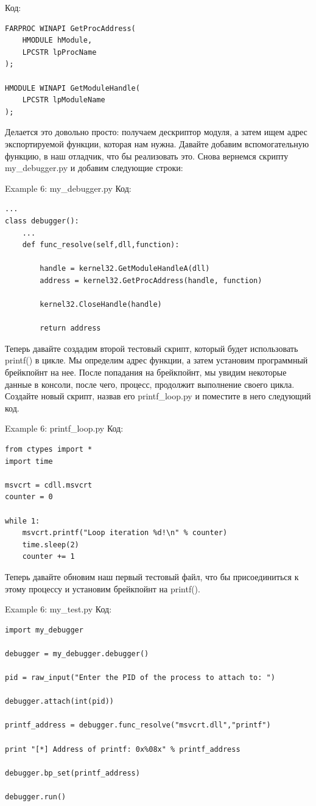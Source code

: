 \documentclass[12pt]{book}
\begin{document}
Код:
\begin{lstlisting}
FARPROC WINAPI GetProcAddress(
    HMODULE hModule,
    LPCSTR lpProcName
);

HMODULE WINAPI GetModuleHandle(
    LPCSTR lpModuleName
);
\end{lstlisting}

Делается это довольно просто: получаем дескриптор модуля, а затем ищем адрес экспортируемой функции, которая нам нужна. Давайте добавим вспомогательную функцию, в наш отладчик, что бы реализовать это. Снова вернемся скрипту my\_debugger.py и добавим следующие строки:

Example 6: my\_debugger.py
Код:
\begin{lstlisting}
...
class debugger():
    ...
    def func_resolve(self,dll,function):

        handle = kernel32.GetModuleHandleA(dll)
        address = kernel32.GetProcAddress(handle, function)

        kernel32.CloseHandle(handle)

        return address
\end{lstlisting}

Теперь давайте создадим второй тестовый скрипт, который будет использовать printf() в цикле. Мы определим адрес функции, а затем установим программный брейкпойнт на нее. После попадания на брейкпойнт, мы увидим некоторые данные в консоли, после чего, процесс, продолжит выполнение своего цикла. Создайте новый скрипт, назвав его printf\_loop.py и поместите в него следующий код.

Example 6: printf\_loop.py
Код:
\begin{lstlisting}
from ctypes import *
import time

msvcrt = cdll.msvcrt
counter = 0

while 1:
    msvcrt.printf("Loop iteration %d!\n" % counter)
    time.sleep(2)
    counter += 1
\end{lstlisting}

Теперь давайте обновим наш первый тестовый файл, что бы присоединиться к этому процессу и установим брейкпойнт на printf().

Example 6: my\_test.py
Код:
\begin{lstlisting}
import my_debugger

debugger = my_debugger.debugger()

pid = raw_input("Enter the PID of the process to attach to: ")

debugger.attach(int(pid))

printf_address = debugger.func_resolve("msvcrt.dll","printf")

print "[*] Address of printf: 0x%08x" % printf_address

debugger.bp_set(printf_address)

debugger.run()
\end{lstlisting}
\end{document}
